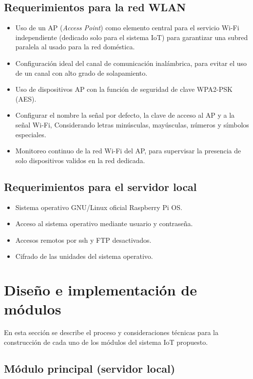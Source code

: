 \subsection{Requerimientos para la red WLAN}

\begin{itemize}
\item Uso de un AP (\emph{Access Point}) como elemento central para el servicio Wi-Fi independiente (dedicado solo para el sistema IoT) para garantizar una subred paralela al usado para la red doméstica.
\item Configuración ideal del canal de comunicación inalámbrica, para evitar el uso de un canal con alto grado de solapamiento.
\item Uso de dispositivos AP con la función de seguridad de clave WPA2-PSK (AES).
\item Configurar el nombre la señal por defecto, la clave de acceso al AP y a la señal Wi-Fi, Considerando letras minúsculas, mayúsculas, números y símbolos especiales.
\item Monitoreo continuo de la red Wi-Fi del AP, para supervisar la presencia de solo dispositivos validos en la red dedicada.
\end{itemize}


\subsection{Requerimientos para el servidor local}

\begin{itemize}
\item Sistema operativo GNU/Linux oficial Raspberry Pi OS.
\item Acceso al sistema operativo mediante usuario y contraseña.
\item Accesos remotos por ssh y FTP desactivados.
\item Cifrado de las unidades del sistema operativo.
\end{itemize}

\section{Diseño e implementación de módulos}

En esta sección se describe el proceso y consideraciones técnicas para la construcción de cada uno de los módulos del sistema IoT propuesto.

\subsection{Módulo principal (servidor local)}

